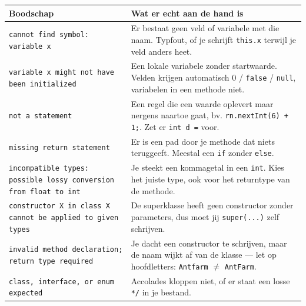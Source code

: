 \documentclass[a4paper,11pt]{article}
\begin{document}
\begin{center}
    \begin{tabular}{@{}p{5.2cm}p{9.2cm}@{}}
        \toprule
        \textbf{Boodschap}                                                       & \textbf{Wat er echt aan de hand is} \\
        \midrule
        \texttt{cannot find symbol: variable x}                                  &
        Er bestaat geen veld of variabele met die naam. Typfout, of je schrijft
        \texttt{this.x} terwijl je veld anders heet.                                                                   \\
        \addlinespace
        \texttt{variable x might not have been initialized}                      &
        Een lokale variabele zonder startwaarde. Velden krijgen automatisch 0 /
        \texttt{false} / \texttt{null}, variabelen in een methode niet.                                                \\
        \addlinespace
        \texttt{not a statement}                                                 &
        Een regel die een waarde oplevert maar nergens naartoe gaat, bv.
        \texttt{rn.nextInt(6) + 1;}. Zet er \texttt{int d =} voor.                                                     \\
        \addlinespace
        \texttt{missing return statement}                                        &
        Er is een pad door je methode dat niets teruggeeft. Meestal een \texttt{if}
        zonder \texttt{else}.                                                                                          \\
        \addlinespace
        \texttt{incompatible types: possible lossy conversion from float to int} &
        Je steekt een kommagetal in een \texttt{int}. Kies het juiste type, ook voor het
        returntype van de methode.                                                                                     \\
        \addlinespace
        \texttt{constructor X in class X cannot be applied to given types}       &
        De superklasse heeft geen constructor zonder parameters, dus moet jij
        \texttt{super(...)} zelf schrijven.                                                                            \\
        \addlinespace
        \texttt{invalid method declaration; return type required}                &
        Je dacht een constructor te schrijven, maar de naam wijkt af van de klasse ---
        let op hoofdletters: \texttt{Antfarm} $\neq$ \texttt{AntFarm}.                                                 \\
        \addlinespace
        \texttt{class, interface, or enum expected}                              &
        Accolades kloppen niet, of er staat een losse \texttt{*/} in je bestand.                                       \\
        \bottomrule
    \end{tabular}
\end{center}
\end{document}

